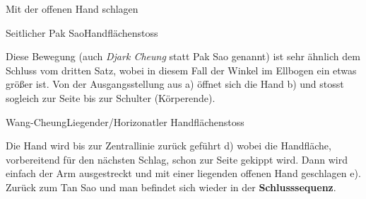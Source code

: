 
\begin{WTSatz}{Mit der offenen Hand schlagen}%

	
	\begin{WTSatzTeil}{Seitlicher Pak Sao}{Handfl\"achenstoss}

		Diese Bewegung (auch \textit{Djark Cheung} statt Pak Sao genannt) ist sehr \"ahnlich dem Schluss vom dritten Satz, wobei in diesem Fall der Winkel im Ellbogen ein etwas gr\"o{\ss}er ist. Von der Ausgangsstellung aus a) \"offnet sich die Hand b) und stosst sogleich zur Seite bis zur Schulter (K\"orperende).
		
		
	\end{WTSatzTeil}
	\begin{WTSatzTeil}{Wang-Cheung}{Liegender/Horizonatler Handfl\"achenstoss}
		
		Die Hand wird bis zur Zentrallinie zur\"uck gef\"uhrt d) wobei die Handfl\"ache, vorbereitend f\"ur den n\"achsten Schlag, schon zur Seite gekippt wird. Dann wird einfach der Arm ausgestreckt und mit einer liegenden offenen Hand geschlagen e). Zur\"uck zum Tan Sao und man befindet sich wieder in der \textbf{Schlusssequenz}.
		
	\end{WTSatzTeil}
\end{WTSatz}



